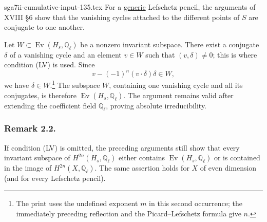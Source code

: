 \begin{filecontents*}{sga7ii-cumulative-input-135.tex}
For a \underline{generic} Lefschetz pencil, the arguments of XVIII §6 show
that the vanishing cycles attached to the different points of $S$ are
conjugate to one another.

Let $W\subset\operatorname{Ev}(H_s,\mathbb Q_\ell)$ be a nonzero invariant
subspace.  There exist a conjugate $\delta$ of a vanishing cycle and an
element $v\in W$ such that $(v,\delta)\ne0$; this is where condition (LV) is
used.  Since
\[
v-(-1)^n(v\cdot\delta)\delta\in W,
\]
we have $\delta\in W$.\footnote{The print uses the undefined exponent $m$ in
this second occurrence; the immediately preceding reflection and the
Picard--Lefschetz formula give $n$.}  The subspace $W$, containing one
vanishing cycle and all its conjugates, is therefore
$\operatorname{Ev}(H_s,\mathbb Q_\ell)$.  The argument remains valid after
extending the coefficient field $\mathbb Q_\ell$, proving absolute
irreducibility.

\subsubsection*{Remark 2.2.}
If condition (LV) is omitted, the preceding arguments still show that every
invariant subspace of $H^{2n}(H_s,\mathbb Q_\ell)$ either contains
$\operatorname{Ev}(H_s,\mathbb Q_\ell)$ or is contained in the image of
$H^{2n}(X,\mathbb Q_\ell)$.  The same assertion holds for $X$ of even
dimension (and for every Lefschetz pencil).

\end{filecontents*}
